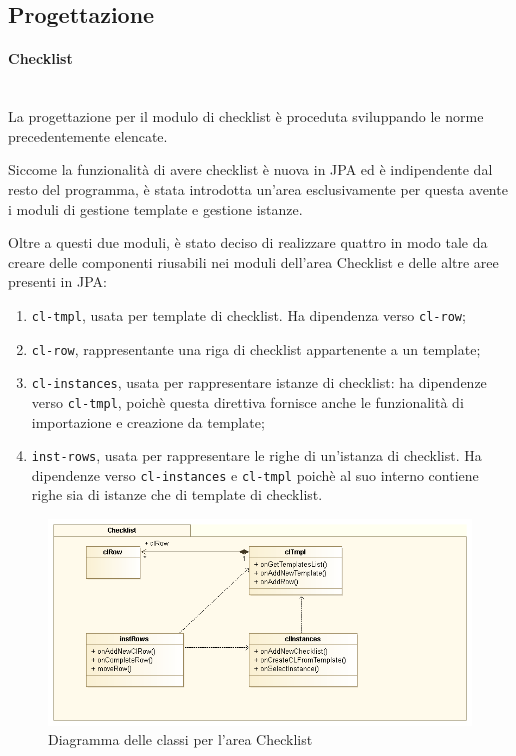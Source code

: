 \subsection{Progettazione}\label{sec:prog-progettazione}

\paragraph{Checklist} \mbox{} \\

La progettazione per il modulo di checklist è proceduta sviluppando le norme
precedentemente elencate.

Siccome la funzionalità di avere checklist è nuova in JPA ed è indipendente
dal resto del programma, è stata introdotta un'area esclusivamente per questa
avente i moduli di gestione template e gestione istanze.

Oltre a questi due moduli, è stato deciso di realizzare quattro
 in modo tale da creare delle componenti riusabili nei moduli
dell'area Checklist e delle altre aree presenti in JPA:

\begin{enumerate}
\item \texttt{cl-tmpl}, usata per template di checklist. Ha dipendenza verso
  \texttt{cl-row};
\item \texttt{cl-row},  rappresentante una riga di checklist
  appartenente a un template;
\item \texttt{cl-instances}, usata per rappresentare istanze di checklist: ha
  dipendenze verso \texttt{cl-tmpl}, poichè questa direttiva fornisce anche le
  funzionalità di importazione e creazione da template;
\item \texttt{inst-rows}, usata per rappresentare le righe di un'istanza di
  checklist. Ha dipendenze verso \texttt{cl-instances} e \texttt{cl-tmpl}
  poichè al suo interno contiene righe sia di istanze che di template di
  checklist.
\end{enumerate}

\begin{figure}[H]%
\centering
\includegraphics[width=\columnwidth]{immagini/cl-plugin}
\caption{Diagramma delle classi per l'area Checklist}
\label{fig:checklist-cd}%
\end{figure}

